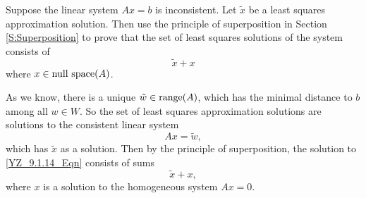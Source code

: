 \documentclass{ximera}
\begin{document}
\begin{exercise}  \label{YZ_9.1.14}
Suppose the linear system $Ax=b$ is inconsistent. Let $\tilde{x}$ be a least squares approximation solution. Then use the principle of superposition in Section \ref{S:Superposition} to prove that the set of least squares solutions of the system consists of 
\[
\tilde{x}+x
\]
where $x\in\textup{null space}(A)$.

\begin{solution}
\soln 
As we know, there is a unique $\tilde{w}\in \textup{range}(A)$, which has the minimal distance to $b$ among all $w\in W$. So the set of least squares approximation solutions are solutions to the consistent linear system
\begin{equation}
Ax=\tilde{w}, \label{YZ_9.1.14_Eqn}
\end{equation}
which has $\tilde{x}$ as a solution. Then by the principle of superposition, the solution to \eqref{YZ_9.1.14_Eqn} consists of sums
\[
\tilde{x}+x,
\]
where $x$ is a solution to the homogeneous system $Ax=0$.
\end{solution}
\end{exercise}
\end{document}
